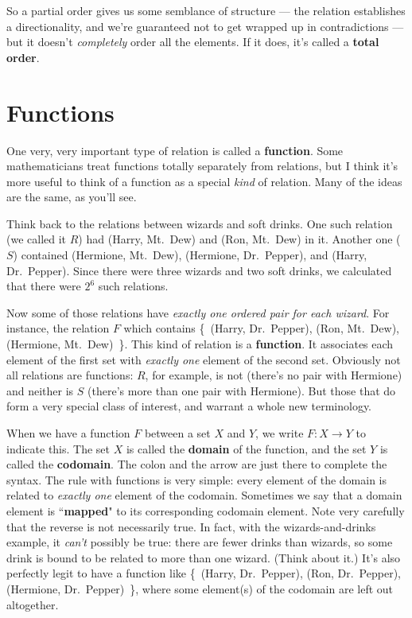 So a partial order gives us some semblance of structure --- the relation
establishes a directionality, and we're guaranteed not to get wrapped up in
contradictions --- but it doesn't \textit{completely} order all the
elements. If it does, it's called a \textbf{total order}.


\section{Functions}

One very, very important type of relation is called a \textbf{function}.
Some mathematicians treat functions totally separately from relations, but
I think it's more useful to think of a function as a special \textit{kind}
of relation. Many of the ideas are the same, as you'll see.

Think back to the relations between wizards and soft drinks. One such
relation (we called it $R$) had (Harry, Mt.~Dew) and (Ron, Mt.~Dew) in it.
Another one ($S$) contained (Hermione, Mt.~Dew), (Hermione, Dr.~Pepper),
and (Harry, Dr.~Pepper). Since there were three wizards and two soft
drinks, we calculated that there were $2^6$ such relations.

Now some of those relations have \textit{exactly one ordered pair for each
wizard}. For instance, the relation $F$ which contains \{~(Harry,
Dr.~Pepper), (Ron, Mt.~Dew), (Hermione, Mt.~Dew)~\}. This kind of relation
is a \textbf{function}. It associates each element of the first set with
\textit{exactly one} element of the second set. Obviously not all relations
are functions: $R$, for example, is not (there's no pair with Hermione) and
neither is $S$ (there's more than one pair with Hermione). But those that
do form a very special class of interest, and warrant a whole new
terminology.

When we have a function $F$ between a set $X$ and $Y$, we write $F : X
\rightarrow Y$ to indicate this. The set $X$ is called the \textbf{domain}
of the function, and the set $Y$ is called the \textbf{codomain}. The colon
and the arrow are just there to complete the syntax. The rule with
functions is very simple: every element of the domain is related to
\textit{exactly one} element of the codomain. Sometimes we say that a
domain element is ``\textbf{mapped}" to its corresponding codomain element.
Note very carefully that the reverse is not necessarily true. In fact, with
the wizards-and-drinks example, it \textit{can't} possibly be true: there
are fewer drinks than wizards, so some drink is bound to be related to more
than one wizard.  (Think about it.) It's also perfectly legit to have a
function like \{~(Harry, Dr.~Pepper), (Ron, Dr.~Pepper), (Hermione,
Dr.~Pepper)~\}, where some element(s) of the codomain are left out
altogether.

